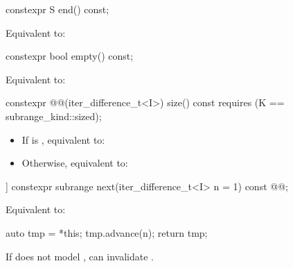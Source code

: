 \documentclass{wg21}
\begin{document}
%
\begin{itemdecl}
	constexpr S end() const;
\end{itemdecl}

\begin{itemdescr}
	\pnum
	\effects
	Equivalent to: 
\end{itemdescr}

%
\begin{itemdecl}
	constexpr bool empty() const;
\end{itemdecl}

\begin{itemdescr}
	\pnum
	\effects
	Equivalent to: 
\end{itemdescr}

%
\begin{itemdecl}
	constexpr @@(iter_difference_t<I>) size() const
	requires (K == subrange_kind::sized);
\end{itemdecl}

\begin{itemdescr}
	\pnum
	\effects
	\begin{itemize}
		\item If  is , equivalent to: 
		\item Otherwise, equivalent to: 
	\end{itemize}
\end{itemdescr}

%
\begin{itemdecl}
	[[nodiscard]] constexpr subrange next(iter_difference_t<I> n = 1) const
	@@;
\end{itemdecl}

\begin{itemdescr}
	\pnum
	\effects
	Equivalent to:
	\begin{codeblock}
		auto tmp = *this;
		tmp.advance(n);
		return tmp;
	\end{codeblock}

	\pnum
	\begin{removedblock}
	\begin{note}
		If  does not model , 
		can invalidate .
	\end{note}
\end{removedblock}
\end{itemdescr}
\end{document}
